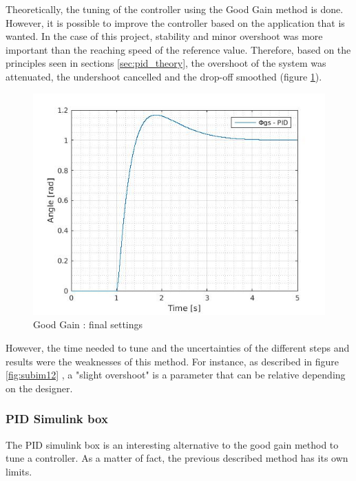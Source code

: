 \vspace{5mm}

Theoretically, the tuning of the controller using the Good Gain method is done. However, it is possible to improve the controller based on the application that is wanted. In the case of this project, stability and minor overshoot was more important than the reaching speed of the reference value. Therefore, based on the principles seen in sections \ref{sec:pid_theory}, the overshoot of the system was attenuated, the undershoot cancelled and the drop-off smoothed (figure \ref{finalGG}).

\begin{figure}[H]
  \centering
  \includegraphics[scale=0.5]{figures/GG5.jpg}
  \caption[LABEL] {Good Gain : final settings}
  \label{finalGG}
\end{figure}

However, the time needed to tune and the uncertainties of the different steps and results were the weaknesses of this method. For instance, as described in figure \ref{fig:subim12} , a "slight overshoot" is a parameter that can be relative depending on the designer.\par  
  
\subsubsection{PID Simulink box}
The PID simulink box is an interesting alternative to the good gain method to tune a controller. As a matter of fact, the previous described method has its own limits.\par 
  

